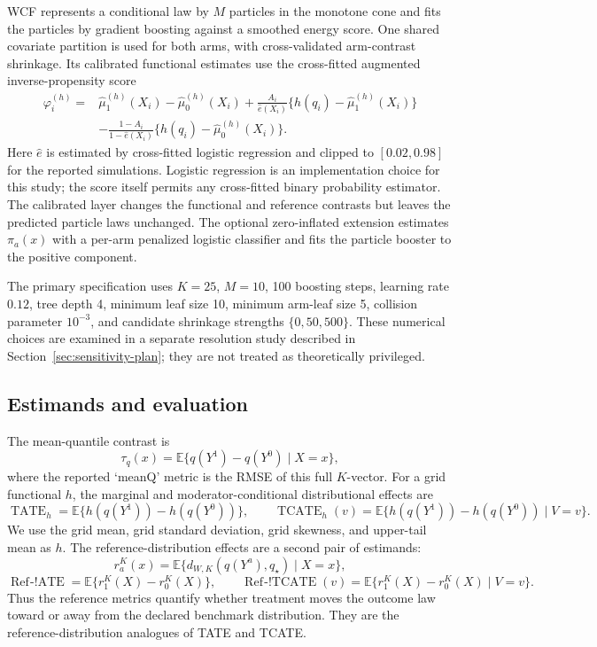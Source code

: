 WCF represents a conditional law by $M$ particles in the monotone cone and
fits the particles by gradient boosting against a smoothed energy score. One
shared covariate partition is used for both arms, with cross-validated
arm-contrast shrinkage. Its calibrated functional estimates use the
cross-fitted augmented inverse-propensity score
\[
\begin{split}
\varphi_i^{(h)}={}&\widehat\mu_1^{(h)}(X_i)-\widehat\mu_0^{(h)}(X_i)
 +\frac{A_i}{\widehat e(X_i)}\{h(q_i)-\widehat\mu_1^{(h)}(X_i)\}\\
&-\frac{1-A_i}{1-\widehat e(X_i)}
 \{h(q_i)-\widehat\mu_0^{(h)}(X_i)\}.
\end{split}
\]
Here $\widehat e$ is estimated by cross-fitted logistic regression and clipped
to $[0.02,0.98]$ for the reported simulations. Logistic regression is an
implementation choice for this study; the score itself permits any
cross-fitted binary probability estimator. The calibrated layer changes the
functional and reference contrasts but leaves the predicted particle laws
unchanged. The optional zero-inflated extension estimates $\pi_a(x)$ with a
per-arm penalized logistic classifier and fits the particle booster to the
positive component.

The primary specification uses $K=25$, $M=10$, 100 boosting steps, learning
rate $0.12$, tree depth 4, minimum leaf size 10, minimum arm-leaf size 5,
collision parameter $10^{-3}$, and candidate shrinkage strengths
$\{0,50,500\}$. These numerical choices are examined in a separate
resolution study described in Section~\ref{sec:sensitivity-plan}; they are
not treated as theoretically privileged.

\subsection{Estimands and evaluation}

The mean-quantile contrast is
\[
\tau_q(x)=\mathbb{E}\{q(Y^1)-q(Y^0)\mid X=x\},
\]
where the reported `meanQ' metric is the RMSE of this full $K$-vector. For a
grid functional $h$, the marginal and moderator-conditional distributional
effects are
\[
\operatorname{TATE}_h=\mathbb{E}\{h(q(Y^1))-h(q(Y^0))\},\qquad
\operatorname{TCATE}_h(v)=\mathbb{E}\{h(q(Y^1))-h(q(Y^0))\mid V=v\}.
\]
We use the grid mean, grid standard deviation, grid skewness, and upper-tail
mean as $h$. The reference-distribution effects are a second pair of
estimands:
\[
r_a^K(x)=\mathbb{E}\{d_{W,K}(q(Y^a),q_\star)\mid X=x\},
\]
\[
\operatorname{Ref\!-!ATE}=\mathbb{E}\{r_1^K(X)-r_0^K(X)\},\qquad
\operatorname{Ref\!-!TCATE}(v)=\mathbb{E}\{r_1^K(X)-r_0^K(X)\mid V=v\}.
\]
Thus the reference metrics quantify whether treatment moves the outcome law
toward or away from the declared benchmark distribution. They are the
reference-distribution analogues of TATE and TCATE.

